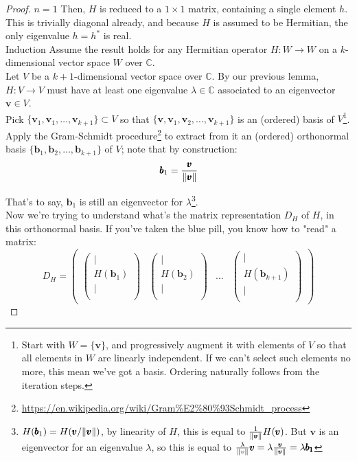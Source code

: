\documentclass[solutions.tex]{subfiles}
\renewcommand{\bm}[1]{\pmb{#1}}
\begin{document}
\begin{proof}
$\boxed{n=1}$ Then, $H$ is reduced to a $1\times 1$ matrix, containing
a single element $h$. This is trivially diagonal already, and because
$H$ is assumed to be Hermitian, the only eigenvalue $h = h^*$ is real. \\

$\boxed{\text{Induction}}$ Assume the result holds for any Hermitian
operator $H : W \rightarrow W$ on a $k$-dimensional vector space $W$
over $\mathbb{C}$. \\

Let $V$ be a $k+1$-dimensional vector space over $\mathbb{C}$.
By our previous lemma, $H : V\rightarrow V$ must have at
least one eigenvalue $\lambda\in\mathbb{C}$ associated to an eigenvector
$\bm{v}\in V$. \\

Pick $\{\bm{v}_1, \bm{v}_1, \ldots, \bm{v}_{k+1} \} \subset V$
so that $\{\bm{v}, \bm{v}_1, \bm{v}_2, \ldots, \bm{v}_{k+1} \}$ is an
(ordered) basis of $V$\footnote{Start with $W=\{ \bm{v} \}$, and progressively
augment it with elements of $V$ so that all elements in $W$ are linearly
independent. If we can't select such elements no more, this mean we've
got a basis. Ordering naturally follows from the iteration steps.}. \\

Apply the Gram-Schmidt procedure\footnote{
\url{https://en.wikipedia.org/wiki/Gram\%E2\%80\%93Schmidt\_process}} to
extract from it an (ordered) orthonormal basis
$\{ \bm{b}_1, \bm{b}_2, \ldots, \bm{b}_{k+1} \}$ of $V$; note that
by construction:
\[
	\bm{b}_1 = \frac{\bm{v}}{\norm{\bm{v}}}
\]

That's to say, $\bm{b}_1$ is still an eigenvector for $\lambda$\footnote{
$H(\bm{b}_1) = H(\bm{v} / \norm{\bm{v}})$, by linearity of $H$,
this is equal to $\frac1{\norm{\bm{v}}}H(\bm{v})$. But $\bm{v}$ is
an eigenvector for an eigenvalue $\lambda$, so this is equal to
$\frac{\lambda}{\norm{v}}\bm{v} = \lambda\frac{\bm{v}}{\norm{\bm{v}}}
= \lambda\bm{b_1}$}. \\

Now we're trying to understand what's the matrix representation $D_H$ of $H$,
in this orthonormal basis. If you've taken the blue pill, you know how to
"read" a matrix:
\[
	D_H = \begin{pmatrix}
		\begin{pmatrix}
			\bigg\vert \\
			H(\bm{b}_1) \\
			\bigg\vert \\
		\end{pmatrix} &
		\begin{pmatrix}
			\bigg\vert \\
			H(\bm{b}_2) \\
			\bigg\vert \\
		\end{pmatrix} &
		\ldots &
		\begin{pmatrix}
			\bigg\vert \\
			H(\bm{b}_{k+1}) \\
			\bigg\vert \\
		\end{pmatrix}
	\end{pmatrix}
\]


\end{proof}
\end{document}
